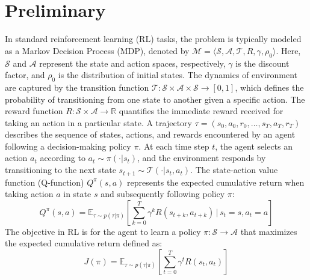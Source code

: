 \section{Preliminary}
In standard reinforcement learning (RL)\cite{sutton1998reinforcement} tasks, the problem is typically modeled as a Markov Decision Process (MDP), denoted by \( \mathcal{M} = \langle \mathcal{S}, \mathcal{A}, \mathcal{T}, R, \gamma, \rho_0 \rangle \). Here, \( \mathcal{S} \) and \( \mathcal{A} \) represent the state and action spaces, respectively, \( \gamma \) is the discount factor, and \( \rho_0 \) is the distribution of initial states. The dynamics of environment are captured by the transition function \( \mathcal{T}: \mathcal{S} \times \mathcal{A} \times \mathcal{S} \to [0, 1] \), which defines the probability of transitioning from one state to another given a specific action. The reward function \( R: \mathcal{S} \times \mathcal{A} \to \mathbb{R} \) quantifies the immediate reward received for taking an action in a particular state.
A trajectory \( \tau = (s_0, a_0, r_0, \dots, s_T, a_T, r_T) \) describes the sequence of states, actions, and rewards encountered by an agent following a decision-making policy \( \pi \). At each time step \( t \), the agent selects an action \( a_t \) according to \( a_t \sim \pi(\cdot | s_t) \), and the environment responds by transitioning to the next state \( s_{t+1} \sim \mathcal{T}(\cdot | s_t, a_t) \).
The state-action value function (Q-function) $Q^\pi(s, a)$ represents the expected cumulative return when taking action $a$ in state $s$ and subsequently following policy $\pi$:
\begin{equation}
    Q^\pi(s, a) = \mathbb{E}_{\tau \sim p(\tau|\pi)} \left[ \sum_{k=0}^{T} \gamma^k R(s_{t+k}, a_{t+k}) \,\bigg|\, s_t = s, a_t = a \right]
\end{equation}
The objective in RL is for the agent to learn a policy \( \pi : \mathcal{S} \to \mathcal{A} \) that maximizes the expected cumulative return defined as:
\begin{equation}
    J(\pi) = \mathbb{E}_{\tau \sim p(\tau|\pi)} \left[ \sum_{t=0}^{T} \gamma^t R(s_t, a_t) \right]
\end{equation}
